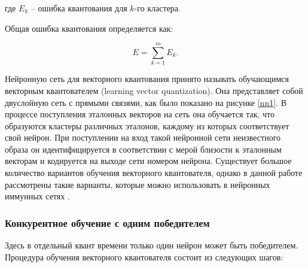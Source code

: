 \documentclass[bachelor, och, referat]{template}
\begin{document}
где $E_k$ -- ошибка квантования для $k$-го кластера.

Общая ошибка квантования определяется как:

\begin{equation}
    E = \sum_{k = 1}^{m} E_k.
\end{equation}

Нейронную сеть для векторного квантования принято называть
обучающимся векторным квантователем (learning vector quantization).
Она представляет собой двуслойную сеть с прямыми связями, как было
показано на рисунке \ref{nn1}. В процессе поступления эталонных векторов на
сеть она обучается так, что образуются кластеры различных эталонов,
каждому из которых соответствует свой нейрон. При поступлении на
вход такой нейронной сети неизвестного образа он идентифицируется
в соответствии с мерой близости к эталонным векторам и кодируется на
выходе сети номером нейрона. Существует большое количество вариантов 
обучения векторного квантователя, однако в данной работе рассмотрены такие
варианты, которые можно использовать в нейронных иммунных сетях \cite{nn1}.


\subsubsection{Конкурентное обучение с одним победителем}

Здесь в отдельный квант времени только один нейрон может быть
победителем. Процедура обучения векторного квантователя состоит из
следующих шагов:
\end{document}
